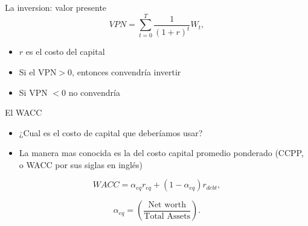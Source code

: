 \documentclass{beamer}
\begin{document}
\begin{frame}{La inversion: valor presente}
    \begin{equation}
VPN = \sum_{t=0} ^{T} \frac{1}{(1+r)^t} W_t,
\end{equation}

\begin{itemize}
    \item $r$ es el costo del capital 
    \item Si el VPN$>0$, entonces convendría invertir
    \item Si VPN $<0$ no convendría
\end{itemize}

 
\end{frame}




\begin{frame}{El WACC}
\begin{itemize}
    \item  ¿Cual es el costo de capital que deberíamos usar?
    \item La manera mas conocida es la del costo capital promedio ponderado (CCPP, o WACC por sus siglas en inglés)
\end{itemize}
     
\begin{equation}
WACC=\alpha _{eq}r_{eq}+\left( 1-\alpha _{eq}\right) r_{debt},
\end{equation}

\begin{equation}
\alpha _{eq}=\left( \frac{\text{Net worth}}{\text{Total Assets}}\right) .
\end{equation}
\end{frame}

\end{document}
